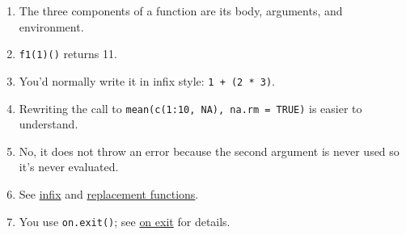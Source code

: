 \enlargethispage*{\baselineskip}

\begin{enumerate}
\def\labelenumi{\arabic{enumi}.}
\item
  The three components of a function are its body, arguments, and
  environment.
\item
  \texttt{f1(1)()} returns 11.
\item
  You'd normally write it in infix style: \texttt{1 + (2 * 3)}.
\item
  Rewriting the call to \texttt{mean(c(1:10, NA), na.rm = TRUE)} is
  easier to understand.
\item
  No, it does not throw an error because the second argument is never
  used so it's never evaluated.
\item
  See \hyperref[infix-functions]{infix} and
  \hyperref[replacement-functions]{replacement functions}.
\item
  You use \texttt{on.exit()}; see \hyperref[on-exit]{on exit} for
  details.
\end{enumerate}
